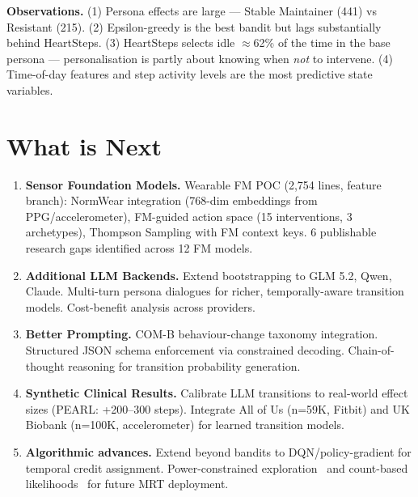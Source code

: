 \documentclass[10pt,a4paper]{article}
\begin{document}
\textbf{Observations.} (1) Persona effects are large --- Stable Maintainer (441) vs Resistant (215). (2) Epsilon-greedy is the best bandit but lags substantially behind HeartSteps. (3) HeartSteps selects idle $\approx$62\% of the time in the base persona --- personalisation is partly about knowing when \emph{not} to intervene. (4) Time-of-day features and step activity levels are the most predictive state variables.

\section{What is Next}

\begin{enumerate}
  \item \textbf{Sensor Foundation Models.} Wearable FM POC (2,754 lines, feature branch): NormWear integration (768-dim embeddings from PPG/accelerometer), FM-guided action space (15 interventions, 3 archetypes), Thompson Sampling with FM context keys. 6 publishable research gaps identified across 12 FM models.
  \item \textbf{Additional LLM Backends.} Extend bootstrapping to GLM 5.2, Qwen, Claude. Multi-turn persona dialogues for richer, temporally-aware transition models. Cost-benefit analysis across providers.
  \item \textbf{Better Prompting.} COM-B behaviour-change taxonomy integration. Structured JSON schema enforcement via constrained decoding. Chain-of-thought reasoning for transition probability generation.
  \item \textbf{Synthetic Clinical Results.} Calibrate LLM transitions to real-world effect sizes (PEARL: +200--300 steps). Integrate All of Us (n=59K, Fitbit) and UK Biobank (n=100K, accelerometer) for learned transition models.
  \item \textbf{Algorithmic advances.} Extend beyond bandits to DQN/policy-gradient for temporal credit assignment. Power-constrained exploration~\cite{yao2021power} and count-based likelihoods~\cite{liu2025thompson} for future MRT deployment.
\end{enumerate}



\end{document}
